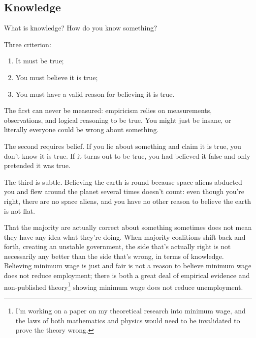 \subsection{Knowledge}

What is knowledge?  How do you know something?

Three criterion:

\begin{enumerate}
    \item It must be true;
    \item You must believe it is true;
    \item You must have a valid reason for believing it is true.
\end{enumerate}

The first can never be measured:  empiricism relies on measurements, observations, and logical reasoning to be true.  You might just be insane, or literally everyone could be wrong about something.

The second requires belief.  If you lie about something and claim it is true, you don't know it is true.  If it turns out to be true, you had believed it false and only pretended it was true.

The third is subtle.  Believing the earth is round because space aliens abducted you and flew around the planet several times doesn't count:  even though you're right, there are no space aliens, and you have no other reason to believe the earth is not flat.

That the majority are actually correct about something sometimes does not mean they have any idea what they're doing.  When majority coalitions shift back and forth, creating an unstable government, the side that's actually right is not necessarily any better than the side that's wrong, in terms of knowledge.  Believing minimum wage is just and fair is not a reason to believe minimum wage does not reduce employment; there is both a great deal of empirical evidence and non-published theory\footnote{I'm working on a paper on my theoretical research into minimum wage, and the laws of both mathematics and physics would need to be invalidated to prove the theory wrong.} showing minimum wage does not reduce unemployment.
